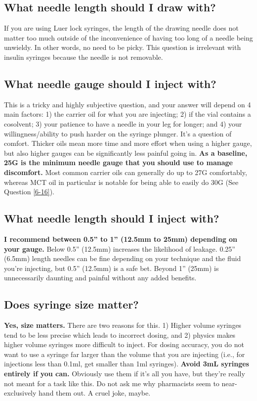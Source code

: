 \documentclass{article}
\begin{document}
\subsection{What needle length should I draw with?}

If you are using Luer lock syringes, the length of the drawing needle does not matter too much outside of the inconvenience of having too long of a needle being unwieldy. In other words, no need to be picky. This question is irrelevant with insulin syringes because the needle is not removable.

\subsection{What needle gauge should I inject with?}\label{5-16}

This is a tricky and highly subjective question, and your answer will depend on 4 main factors: 1) the carrier oil for what you are injecting; 2) if the vial contains a cosolvent; 3) your patience to have a needle in your leg for longer; and 4) your willingness/ability to push harder on the syringe plunger. It’s a question of comfort. Thicker oils mean more time and more effort when using a higher gauge, but also higher gauges can be significantly less painful going in. \textbf{As a baseline, 25G is the minimum needle gauge that you should use to manage discomfort. }Most common carrier oils can generally do up to 27G comfortably, whereas MCT oil in particular is notable for being able to easily do 30G (See Question \ref{6-16}).

\subsection{What needle length should I inject with?}

\textbf{I recommend between 0.5” to 1” (12.5mm to 25mm) depending on your gauge.} Below 0.5” (12.5mm) increases the likelihood of leakage. 0.25” (6.5mm) length needles can be fine depending on your technique and the fluid you’re injecting, but 0.5” (12.5mm) is a safe bet. Beyond 1” (25mm) is unnecessarily daunting and painful without any added benefits.

\subsection{Does syringe size matter?}

\textbf{Yes, size matters.} There are two reasons for this. 1) Higher volume syringes tend to be less precise which leads to incorrect dosing, and 2) physics makes higher volume syringes more difficult to inject. For dosing accuracy, you do not want to use a syringe far larger than the volume that you are injecting (i.e., for injections less than 0.1ml, get smaller than 1ml syringes). \textbf{Avoid 3mL syringes entirely if you can.} Obviously use them if it’s all you have, but they’re really not meant for a task like this. Do not ask me why pharmacists seem to near-exclusively hand them out. A cruel joke, maybe.
\end{document}

